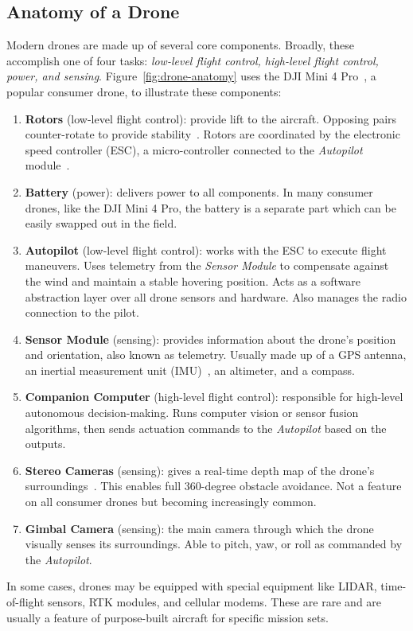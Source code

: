 \subsection{Anatomy of a Drone}
\label{sec:drone-anatomy}
Modern drones are made up of several core components. Broadly, these accomplish one of four tasks: \textit{low-level flight control, high-level flight control, power, and sensing}. Figure~\ref{fig:drone-anatomy} uses the DJI Mini 4 Pro~\cite{DJIMini4}, a popular consumer drone, to illustrate these components:

\begin{enumerate}
    \item \textbf{Rotors} (low-level flight control): provide lift to the aircraft. Opposing pairs counter-rotate to provide stability~\cite{Allain2017}. Rotors are coordinated by the electronic speed controller (ESC), a micro-controller connected to the \textit{Autopilot} module~\cite{Nagel2023}.
    \item \textbf{Battery} (power): delivers power to all components. In many consumer drones, like the DJI Mini 4 Pro, the battery is a separate part which can be easily swapped out in the field.
    \item \textbf{Autopilot} (low-level flight control): works with the ESC to execute flight maneuvers. Uses telemetry from the \textit{Sensor Module} to compensate against the wind and maintain a stable hovering position. Acts as a software abstraction layer over all drone sensors and hardware. Also manages the radio connection to the pilot.
    \item \textbf{Sensor Module} (sensing): provides information about the drone's position and orientation, also known as telemetry. Usually made up of a GPS antenna, an inertial measurement unit (IMU)~\cite{IMU}, an altimeter, and a compass.
    \item \textbf{Companion Computer} (high-level flight control): responsible for high-level autonomous decision-making. Runs computer vision or sensor fusion algorithms, then sends actuation commands to the \textit{Autopilot} based on the outputs.
    \item \textbf{Stereo Cameras} (sensing): gives a real-time depth map of the drone's surroundings~\cite{Stereo}. This enables full 360-degree obstacle avoidance. Not a feature on all consumer drones but becoming increasingly common.
    \item \textbf{Gimbal Camera} (sensing): the main camera through which the drone visually senses its surroundings. Able to pitch, yaw, or roll as commanded by the \textit{Autopilot}.
\end{enumerate}
In some cases, drones may be equipped with special equipment like LIDAR, time-of-flight sensors, RTK modules, and cellular modems. These are rare and are usually a feature of purpose-built aircraft for specific mission sets. 

